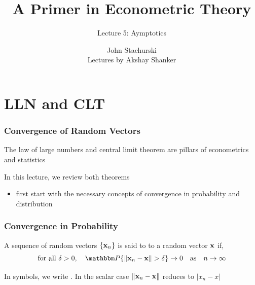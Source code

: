 

\newcommand{\seti}{\setcounter{saveenumi}{\value{enumi}}}
\newcommand{\conti}{\setcounter{enumi}{\value{saveenumi}}}

\usepackage[export]{adjustbox}




\title{A Primer in Econometric Theory}

\subtitle
{Lecture 5: Aymptotics}

\author{John Stachurski \\ \tiny Lectures by Akshay Shanker}






\begin{frame}
  \titlepage
\end{frame}

\section{LLN and CLT}

\begin{frame}\frametitle{Convergence of Random Vectors}
    
    \vspace{2em}
    The law of large numbers and central limit theorem are pillars of econometrics and statistics
    
    \vspace{1em}
    In this lecture, we review both theorems
    
    \begin{itemize}
        \item first start with the necessary concepts of convergence in probability and
    distribution
    \end{itemize}

    
\end{frame}

\begin{frame}\frametitle{Convergence in Probability}

    \vspace{2em}
    A sequence of random vectors $\{{\mathbf x}_n\}$ is said to 
     to a random vector ${\mathbf x}$ if,
    \begin{equation}
        \label{eq:coninp}
        \text{for all $\delta > 0$},
        \quad
        \PP \{ \|\boldx_n - \boldx\| > \delta \} \to 0 
        \quad \text{as} \quad
        n \to \infty
    \end{equation}
    
    \vspace{1em}
    In symbols, we write .  In the scalar case
    $\|{\mathbf x}_n - {\mathbf x}\|$ reduces to $|x_n - x|$
    
\end{frame}


